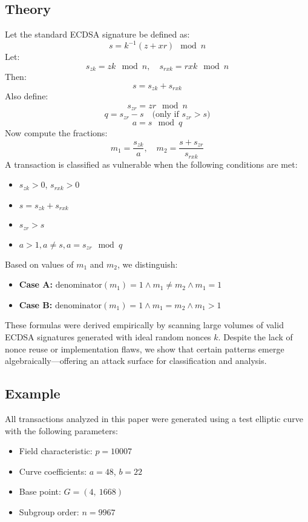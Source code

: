 \documentclass[11pt]{article}
\begin{document}
\subsection{Theory}
Let the standard ECDSA signature be defined as:
\[
s = k^{-1}(z + xr) \mod n
\]
Let:
\[
s_{zk} = zk \mod n, \quad s_{rxk} = rxk \mod n
\]
Then:
\[
s = s_{zk} + s_{rxk}
\]
Also define:
\[
s_{zr} = zr \mod n
\]
\[
q = s_{zr} - s \quad \text{(only if } s_{zr} > s \text{)}
\]
\[
a = s \mod q
\]
Now compute the fractions:
\[
m_1 = \frac{s_{zk}}{a}, \quad m_2 = \frac{s + s_{zr}}{s_{rxk}}
\]
A transaction is classified as vulnerable when the following conditions are met:
\begin{itemize}
  \item \( s_{zk} > 0 \), \( s_{rxk} > 0 \)
  \item \( s = s_{zk} + s_{rxk} \)
  \item \( s_{zr} > s \)
  \item \( a > 1, a \neq s, a = s_{zr} \mod q \)
\end{itemize}
Based on values of \( m_1 \) and \( m_2 \), we distinguish:
\begin{itemize}
  \item \textbf{Case A:} \( \text{denominator}(m_1) = 1 \land m_1 \neq m_2 \land m_1 = 1 \)
  \item \textbf{Case B:} \( \text{denominator}(m_1) = 1 \land m_1 = m_2 \land m_1 > 1 \)
\end{itemize}
These formulas were derived empirically by scanning large volumes of valid ECDSA signatures generated with ideal random nonces \( k \). Despite the lack of nonce reuse or implementation flaws, we show that certain patterns emerge algebraically—offering an attack surface for classification and analysis.

\subsection{Example}
All transactions analyzed in this paper were generated using a test elliptic curve with the following parameters:

\begin{itemize}
  \item Field characteristic: $p = 10007$
  \item Curve coefficients: $a = 48$, $b = 22$
  \item Base point: $G = (4,\ 1668)$
  \item Subgroup order: $n = 9967$
\end{itemize}
\end{document}
